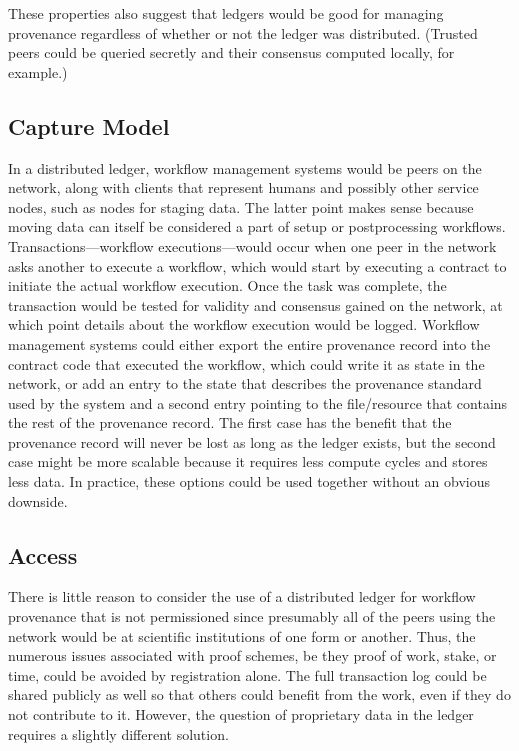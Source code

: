 These properties also suggest that ledgers would be good for managing provenance
regardless of whether or not the ledger was distributed. (Trusted peers could be
queried secretly and their consensus computed locally, for example.)

\subsection{Capture Model}
In a distributed ledger, workflow management systems would be peers on the
network, along with clients that represent humans and possibly other service
nodes, such as nodes for staging data. The latter point makes sense because
moving data can itself be considered a part of setup or postprocessing
workflows. Transactions---workflow executions---would occur when one peer in the
network asks another to execute a workflow, which would start by executing a
contract to initiate the actual workflow execution. Once the task was complete,
the transaction would be tested for validity and consensus gained on the
network, at which point details about the workflow execution would be logged.
Workflow management systems could either export the entire provenance record
into the contract code that executed the workflow, which could write it as state
in the network, or add an entry to the state that describes the provenance
standard used by the system and a second entry pointing to the file/resource
that contains the rest of the provenance record. The first case has the benefit
that the provenance record will never be lost as long as the ledger exists, but
the second case might be more scalable because it requires less compute cycles
and stores less data. In practice, these options could be used together without
an obvious downside.

\subsection{Access}
There is little reason to consider the use of a distributed ledger for workflow
provenance that is not permissioned since presumably all of the peers using the
network would be at scientific institutions of one form or another. Thus, the
numerous issues associated with proof schemes, be they proof of work, stake, or
time, could be avoided by registration alone. The full transaction log could be
shared publicly as well so that others could benefit from the work, even if they
do not contribute to it. However, the question of proprietary data in the ledger
requires a slightly different solution.


